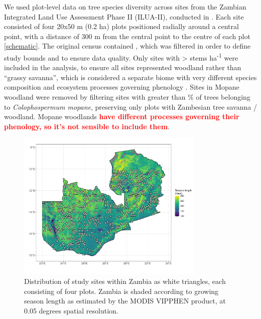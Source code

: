 \documentclass[11pt,a4paper]{article}
\newcommand{\todo}[1]{\textcolor{red}{\textbf{#1}}}   %
\begin{document}
We used plot-level data on tree species diversity across \nSites{} sites from the Zambian Integrated Land Use Assessment Phase II (ILUA-II), conducted in \censusDate{} \citep{}. Each site consisted of four 20x50 m (0.2 ha) plots positioned radially around a central point, with a distance of 300 m from the central point to the centre of each plot \autoref{schematic}. The original census contained \nTotalSites{}, which was filtered in order to define study bounds and to ensure data quality. Only sites with >\stemsHa{} stems ha\textsuperscript{-1} were included in the analysis, to ensure all sites represented woodland rather than “grassy savanna”, which is considered a separate biome with very different species composition and ecosystem processes governing phenology \citep{Parr2014}. Sites in Mopane woodland were removed by filtering sites with greater than \mopanePer{}\% of trees belonging to \textit{Colophospermum mopane}, preserving only plots with Zambesian tree savanna / woodland. Mopane woodlands \todo{have different processes governing their phenology, so it's not sensible to include them}. 
\begin{figure}[H]
\centering
	\includegraphics[width=0.8\textwidth]{plot_loc}
	\caption{Distribution of study sites within Zambia as white triangles, each consisting of four plots. Zambia is shaded according to growing season length as estimated by the MODIS VIPPHEN product, at 0.05 degrees spatial resolution.}
	\label{plot_loc}
\end{figure}
\end{document}
